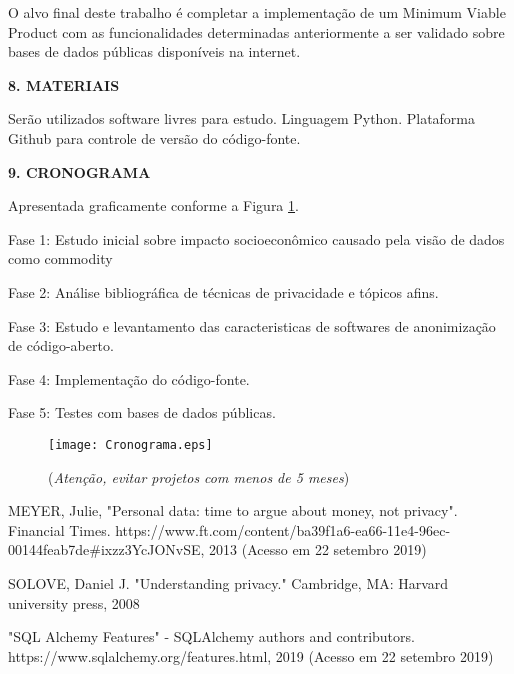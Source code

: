 \documentclass[a4paper,12pt,oneside,openany]{report}
\begin{document}
O alvo final deste trabalho é completar a implementação de um Minimum Viable Product com as funcionalidades determinadas anteriormente a ser validado sobre bases de dados públicas disponíveis na internet.

\vspace{0.4cm}
\textbf{8. MATERIAIS}
	
Serão utilizados software livres para estudo. Linguagem Python. Plataforma Github para controle de versão do código-fonte.

\vspace{0.4cm}
\textbf{9. CRONOGRAMA}

Apresentada graficamente conforme a Figura \ref{Fig:Cronograma}.

Fase 1: Estudo inicial sobre impacto socioeconômico causado pela visão de dados como commodity

Fase 2: Análise bibliográfica de técnicas de privacidade e tópicos afins.

Fase 3: Estudo e levantamento das caracteristicas de softwares de anonimização de código-aberto.

Fase 4: Implementação do código-fonte.

Fase 5: Testes com bases de dados públicas.


\begin{figure}
\begin{center}
\parbox[h]{14cm}
  {
  \begin{center}
  \texttt{[image: Cronograma.eps]}
  \caption[\small{(\textit{Atenção, evitar projetos com menos de 5 meses})}]{\label{Fig:Cronograma} \footnotesize{(\textit{Atenção, evitar projetos com menos de 5 meses})}}
  \end{center}
  }
\end{center}
\end{figure} 

\begin{thebibliography}{}

 MEYER, Julie, "Personal data: time to argue about money, not privacy". Financial Times. https://www.ft.com/content/ba39f1a6-ea66-11e4-96ec-00144feab7de#ixzz3YcJONvSE, 2013 (Acesso em 22 setembro 2019)

 SOLOVE, Daniel J. "Understanding privacy." Cambridge, MA: Harvard university press, 2008

 "SQL Alchemy Features" - SQLAlchemy authors and contributors. https://www.sqlalchemy.org/features.html, 2019 (Acesso em 22 setembro 2019)

\end{thebibliography}
\end{document}

